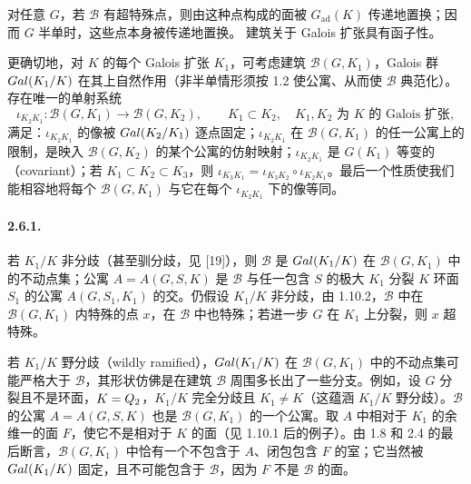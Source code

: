 对任意 $G$，若 $\mathscr B$ 有超特殊点，则由这种点构成的面被 $G_{\mathrm{ad}}(K)$ 传递地置换；因而 $G$ 半单时，这些点本身被传递地置换。
建筑关于 Galois 扩张具有函子性。

更确切地，对 $K$ 的每个 Galois 扩张 $K_1$，可考虑建筑 $\mathscr B(G,K_1)$，Galois 群 $Gal(K_1/K)$ 在其上自然作用（非半单情形须按 1.2 使公寓、从而使 $\mathscr B$ 典范化）。存在唯一的单射系统
\[
\iota_{K_2K_1}:\mathscr B(G,K_1)\longrightarrow\mathscr B(G,K_2),
\qquad K_1\subset K_2,\quad K_1,K_2\text{ 为 }K\text{ 的 Galois 扩张},
\]
满足：$\iota_{K_2K_1}$ 的像被 $Gal(K_2/K_1)$ 逐点固定；$\iota_{K_2K_1}$ 在 $\mathscr B(G,K_1)$ 的任一公寓上的限制，是映入 $\mathscr B(G,K_2)$ 的某个公寓的仿射映射；$\iota_{K_2K_1}$ 是 $G(K_1)$ 等变的（covariant）；若 $K_1\subset K_2\subset K_3$，则 $\iota_{K_3K_1}=\iota_{K_3K_2}\circ\iota_{K_2K_1}$。最后一个性质使我们能相容地将每个 $\mathscr B(G,K_1)$ 与它在每个 $\iota_{K_2K_1}$ 下的像等同。

\paragraph*{2.6.1.}若 $K_1/K$ 非分歧（甚至驯分歧，见 [19]），则 $\mathscr B$ 是 $Gal(K_1/K)$ 在 $\mathscr B(G,K_1)$ 中的不动点集；公寓 $A=A(G,S,K)$ 是 $\mathscr B$ 与任一包含 $S$ 的极大 $K_1$ 分裂 $K$ 环面 $S_1$ 的公寓 $A(G,S_1,K_1)$ 的交。仍假设 $K_1/K$ 非分歧，由 1.10.2，$\mathscr B$ 中在 $\mathscr B(G,K_1)$ 内特殊的点 $x$，在 $\mathscr B$ 中也特殊；若进一步 $G$ 在 $K_1$ 上分裂，则 $x$ 超特殊。

若 $K_1/K$ 野分歧（wildly ramified），$Gal(K_1/K)$ 在 $\mathscr B(G,K_1)$ 中的不动点集可能严格大于 $\mathscr B$，其形状仿佛是在建筑 $\mathscr B$ 周围多长出了一些分支。例如，设 $G$ 分裂且不是环面，$K=Q_2$，$K_1/K$ 完全分歧且 $K_1\ne K$（这蕴涵 $K_1/K$ 野分歧）。$\mathscr B$ 的公寓 $A=A(G,S,K)$ 也是 $\mathscr B(G,K_1)$ 的一个公寓。取 $A$ 中相对于 $K_1$ 的余维一的面 $F$，使它不是相对于 $K$ 的面（见 1.10.1 后的例子）。由 1.8 和 2.4 的最后断言，$\mathscr B(G,K_1)$ 中恰有一个不包含于 $A$、闭包包含 $F$ 的室；它当然被 $Gal(K_1/K)$ 固定，且不可能包含于 $\mathscr B$，因为 $F$ 不是 $\mathscr B$ 的面。

